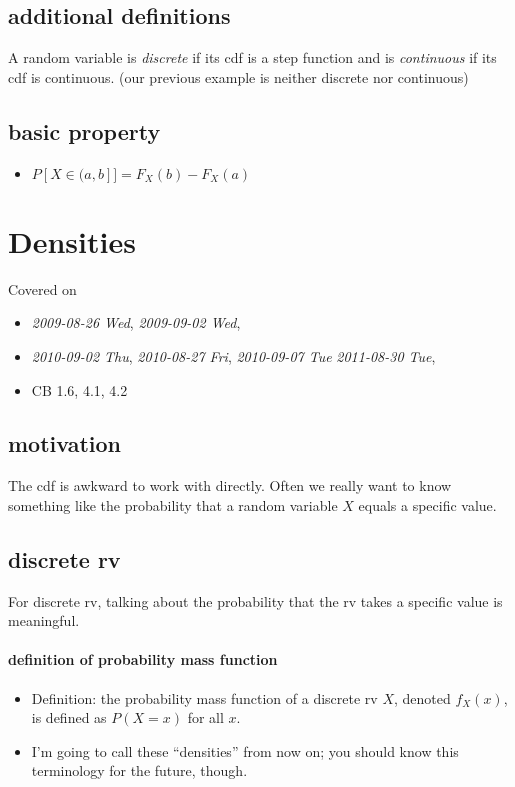 \subsection{additional definitions}
\label{sec-2-3}

     A random variable is \emph{discrete} if its cdf is a step function and
     is \emph{continuous} if its cdf is continuous.  (our previous example is
     neither discrete nor continuous)
\subsection{basic property}
\label{sec-2-4}

\begin{itemize}
\item $P[X \in (a, b]] = F_X(b) - F_X(a)$
\end{itemize}
\section{Densities}
\label{sec-3}

    Covered on 
\begin{itemize}
\item \textit{2009-08-26 Wed}, \textit{2009-09-02 Wed},
\item \textit{2010-09-02 Thu}, \textit{2010-08-27 Fri}, \textit{2010-09-07 Tue}
      \textit{2011-08-30 Tue},
\item CB 1.6, 4.1, 4.2
\end{itemize}
\subsection{motivation}
\label{sec-3-1}

     The cdf is awkward to work with directly.  Often we really want to
     know something like the probability that a random variable $X$
     equals a specific value.
\subsection{discrete rv}
\label{sec-3-2}

     For discrete rv, talking about the probability that the rv takes a
     specific value is meaningful.
\paragraph{definition of probability mass function}
\label{sec-3-2-1}

\begin{itemize}
\item Definition: the probability mass function of a discrete rv
        $X$, denoted $f_X(x)$, is defined as $P(X = x)$ for all $x$.
\item I'm going to call these ``densities'' from now on; you should know
        this terminology for the future, though.
\end{itemize}

